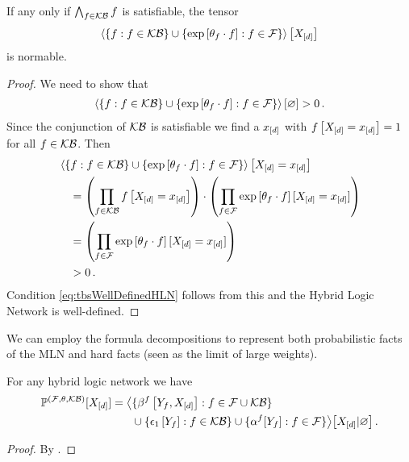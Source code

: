 \begin{theorem}
	If any only if $\bigwedge_{f\in\mathcal{KB}}f$ is satisfiable, the tensor 
		\[  \left\langle 
		\{f : f\in\mathcal{KB}\} \cup \{\mathrm{exp}\left[\theta_{f}\cdot f\right] : f\in\mathcal{F}\}
		\right\rangle \left[ X_{[d]} \right] \]
	is normable.
\end{theorem}
\begin{proof}
	We need to show that
	\begin{align}\label{eq:tbsWellDefinedHLN}
		\left\langle \{f : f\in\mathcal{KB}\} \cup \{\mathrm{exp}\left[\theta_{f}\cdot f\right] : f\in\mathcal{F}\}\right\rangle \left[ \varnothing \right] > 0 \, . 
	\end{align}
	Since the conjunction of $\mathcal{KB}$ is satisfiable we find a $x_{[d]}$ with $f\left[X_{[d]}=x_{[d]}\right]=1$ for all $f\in\mathcal{KB}$.
	Then 
	\begin{align*}
		& \left\langle \{f : f\in\mathcal{KB}\} \cup \{\mathrm{exp}\left[\theta_{f}\cdot f\right] : f\in\mathcal{F}\}\right\rangle \left[ X_{[d]}=x_{[d]} \right] \\
		 & \quad = \left( \prod_{f\in\mathcal{KB}}f\left[X_{[d]}=x_{[d]}\right] \right)
		 \cdot \left( \prod_{f\in\mathcal{F}}\mathrm{exp}\left[\theta_{f}\cdot f\right][X_{[d]}=x_{[d]}] \right) \\
		 & \quad =  \left( \prod_{f\in\mathcal{F}}\mathrm{exp}\left[\theta_{f}\cdot f\right][X_{[d]}=x_{[d]}] \right) \\
		 & \quad > 0 \, .
	\end{align*}
	Condition \eqref{eq:tbsWellDefinedHLN} follows from this and the Hybrid Logic Network is well-defined.
\end{proof}



We can employ the formula decompositions to represent both probabilistic facts of the MLN and hard facts (seen as the limit of large weights).

\begin{theorem}\label{the:hybridNetworkRepresentation}
	For any hybrid logic network we have
	\begin{align*}
		\mathbb{P}^{(\mathcal{F},\theta,\mathcal{KB})}[X_{[d]}] 
		= \big\langle 
		&\{\beta^{f}\left[Y_{f},X_{[d]}\right] : f\in\mathcal{F}\cup\mathcal{KB} \} \\
		&\cup \{\epsilon_1\left[Y_{f}\right] : f\in\mathcal{KB} \}
		\cup \{\alpha^{f}[Y_{f}] : f\in\mathcal{F} \}
		 \big\rangle \big[ X_{[d]} | \varnothing \big] \, .
	\end{align*}
\end{theorem}
\begin{proof}
	By .
\end{proof}

